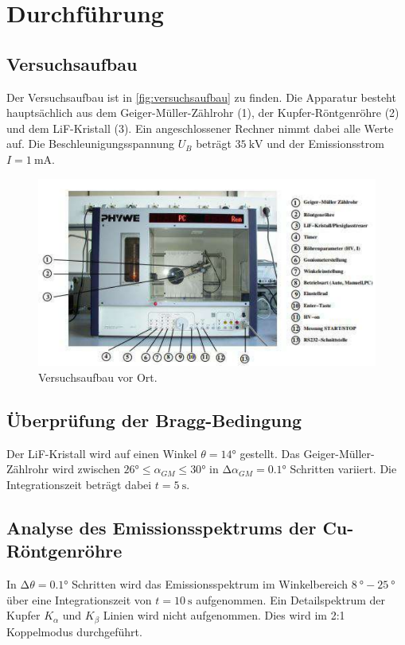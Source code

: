 \section{Durchführung}
\label{sec:Durchführung}

\subsection{Versuchsaufbau}
\label{subsec:Versuchsaufbau}
Der Versuchsaufbau ist in \autoref{fig:versuchsaufbau} zu finden.
Die Apparatur besteht hauptsächlich aus dem Geiger-Müller-Zählrohr (1), der Kupfer-Röntgenröhre (2)
und dem LiF-Kristall (3).
Ein angeschlossener Rechner nimmt dabei alle Werte auf.
Die Beschleunigungsspannung $U_B$ beträgt $\SI{35}{\kilo\volt}$ und der Emissionsstrom $I = \SI{1}{\milli\ampere}$.

\begin{figure}
    \centering
    \includegraphics[width=\textwidth]{content/versuchsaufbau.pdf}
    \caption{Versuchsaufbau vor Ort.\cite{anleitung}}
    \label{fig:versuchsaufbau}
\end{figure}

\subsection{Überprüfung der Bragg-Bedingung}
\label{subsec:braggbedingung}
Der LiF-Kristall wird auf einen Winkel $\theta = 14°$ gestellt.
Das Geiger-Müller-Zählrohr wird zwischen $26° \leq \alpha_{GM} \leq 30°$ in $\increment \alpha_{GM} = 0.1°$ Schritten variiert.
Die Integrationszeit beträgt dabei $t = \SI{5}{\second}$.

\subsection{Analyse des Emissionsspektrums der Cu-Röntgenröhre}
\label{subsec:emissionspektrum}
In $\increment \theta = 0.1°$ Schritten wird das Emissionsspektrum im Winkelbereich $\SI{8}{\degree} - \SI{25}{\degree}$ über
 eine Integrationszeit von $t = \SI{10}{\second}$ aufgenommen.
Ein Detailspektrum der Kupfer $K_\alpha$  und $K_\beta$ Linien wird nicht aufgenommen.
Dies wird im 2:1 Koppelmodus durchgeführt.

